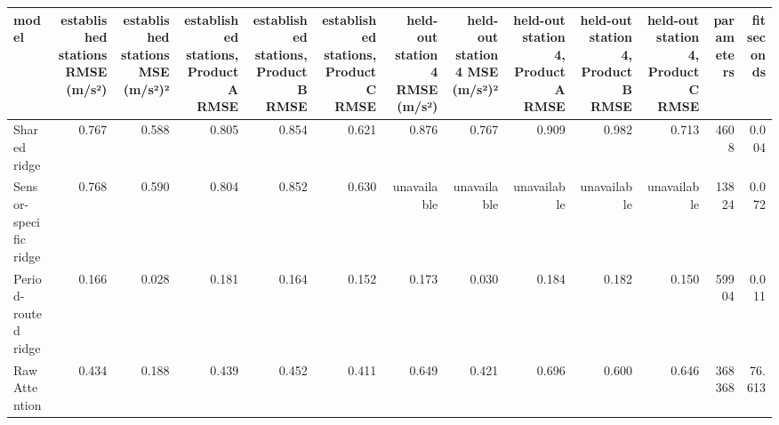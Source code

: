 \begin{tabular}{lrrrrrrrrrrrr}
\toprule
model & established stations RMSE (m/s²) & established stations MSE (m/s²)² & established stations, Product A RMSE & established stations, Product B RMSE & established stations, Product C RMSE & held-out station 4 RMSE (m/s²) & held-out station 4 MSE (m/s²)² & held-out station 4, Product A RMSE & held-out station 4, Product B RMSE & held-out station 4, Product C RMSE & parameters & fit seconds \\
\midrule
Shared ridge & 0.767 & 0.588 & 0.805 & 0.854 & 0.621 & 0.876 & 0.767 & 0.909 & 0.982 & 0.713 & 4608 & 0.004 \\
Sensor-specific ridge & 0.768 & 0.590 & 0.804 & 0.852 & 0.630 & unavailable & unavailable & unavailable & unavailable & unavailable & 13824 & 0.072 \\
Period-routed ridge & 0.166 & 0.028 & 0.181 & 0.164 & 0.152 & 0.173 & 0.030 & 0.184 & 0.182 & 0.150 & 59904 & 0.011 \\
Raw Attention & 0.434 & 0.188 & 0.439 & 0.452 & 0.411 & 0.649 & 0.421 & 0.696 & 0.600 & 0.646 & 368368 & 76.613 \\
\bottomrule
\end{tabular}

